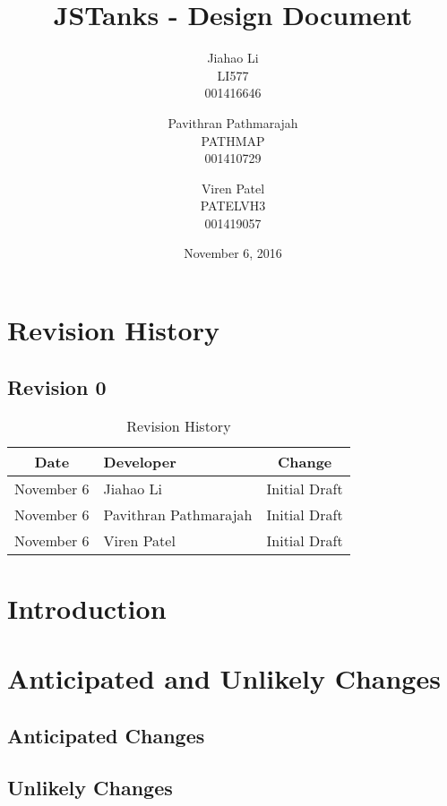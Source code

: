 \documentclass{article}
\begin{document}
\newpage
\title{JSTanks - Design Document}
\date{November 6, 2016}
\author{Jiahao Li\\LI577\\001416646\and Pavithran Pathmarajah\\PATHMAP\\
001410729 \and Viren Patel\\PATELVH3\\001419057}

\maketitle

\newpage
{}
\tableofcontents

\newpage
\section{Revision History}
\subsection{Revision 0}
\begin{table}[H]
\caption{Revision History}
	\begin{tabularx}{\textwidth}{cXc}
		\toprule
		Date & Developer & Change\\
		\midrule
		November 6&Jiahao Li &Initial Draft \\
		November 6&Pavithran Pathmarajah &Initial Draft\\
		November 6&Viren Patel  &Initial Draft\\
	\end{tabularx}
\end{table}

\section{Introduction}

\section{Anticipated and Unlikely Changes}
\subsection{Anticipated Changes}
\subsection{Unlikely Changes}
\end{document}
